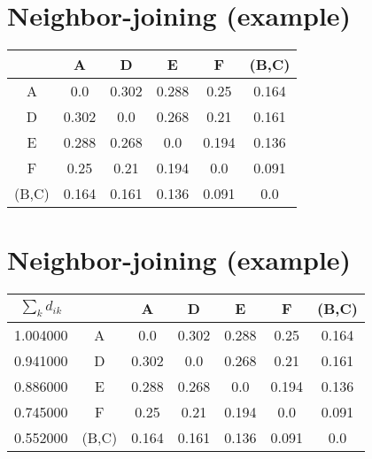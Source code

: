 \documentclass[landscape]{foils}
\begin{document}
\myNewSlide
\section*{Neighbor-joining (example)}
\begin{table}[htdp]
\begin{center}
\begin{tabular}{|c|c|c|c|c|c|}
\hline
 & A  & D & E & F & (B,C)  \\ 
\hline
A & 0.0 & 0.302 & 0.288 & 0.25 & 0.164 \\
D & 0.302 & 0.0 & 0.268 & 0.21 & 0.161 \\
E & 0.288 & 0.268 & 0.0 & 0.194 & 0.136 \\
F & 0.25 & 0.21 & 0.194 & 0.0 & 0.091 \\
(B,C) & 0.164 & 0.161 & 0.136 & 0.091 & 0.0\\
\hline
\end{tabular}
\end{center}
\end{table}%



\myNewSlide
\section*{Neighbor-joining (example)}
\begin{table}[htdp]
\begin{center}
\begin{tabular}{|c|c|c|c|c|c|c|}
\hline
$\sum_{k} d_{ik}$ &  & A & D & E & F & (B,C)  \\ 
\hline
1.004000 & A & 0.0 & 0.302 & 0.288 & 0.25 & 0.164 \\
0.941000 & D & 0.302 & 0.0 & 0.268 & 0.21 & 0.161 \\
0.886000 & E & 0.288 & 0.268 & 0.0 & 0.194 & 0.136 \\
0.745000 & F & 0.25 & 0.21 & 0.194 & 0.0 & 0.091 \\
0.552000 & (B,C) & 0.164 & 0.161 & 0.136 & 0.091 & 0.0 \\
\hline
\end{tabular}
\end{center}
\end{table}%

\myNewSlide
\end{document}
